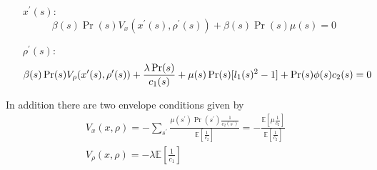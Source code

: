 \documentclass[thmsb,11pt]{article}
\begin{document}
\begin{appendix}
\begin{enumerate}
\item[$x^{\prime }(s):$]
\begin{equation}
\beta(s) \Pr(s)V_x(x^{\prime }(s),\rho^{\prime }(s)) + \beta(s)\Pr(s)\mu(s) = 0
\label{eq.x'FOC}
\end{equation}

\item[$\rho^{\prime }(s):$]
\begin{equation}
\beta(s) \Pr(s) V_{\rho}(x^{\prime }(s),\rho^{\prime }(s))+\frac{\lambda \Pr(s)}{%
c_1(s)}+\mu(s)\Pr(s)[l_1(s)^2-1]+\Pr(s)\phi(s)c_2(s) = 0  \label{eq.FOCNend}
\end{equation}
\end{enumerate}

In addition there are two envelope conditions given by
\begin{align}
V_x(x,\rho) = -\sum_{s^{\prime }}\frac{\mu(s^{\prime })\Pr(s^{\prime
})\frac1{c_2(s^{\prime })}}{\mathbb{E}[\frac1{c_2}]} = -\frac{\mathbb{E}%
[\mu\frac1{c_2}]}{\mathbb{E}[\frac1{c_2}]} \\
V_{\rho}(x,\rho) = -\lambda\mathbb{E}[\frac1{c_1}]  \label{eq.rho_env}
\end{align}


\end{appendix}
\end{document}
